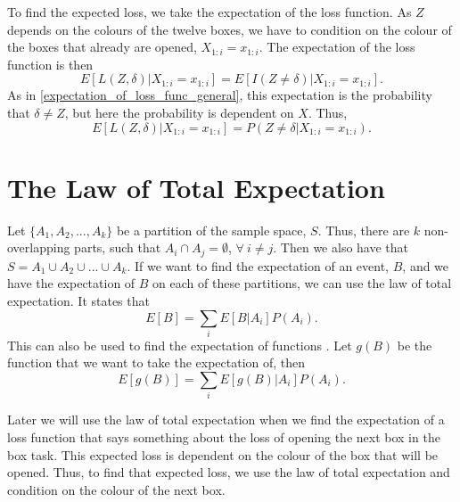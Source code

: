 To find the expected loss, we take the expectation of the loss function. As $Z$ depends on the colours of the twelve boxes, we have to condition on the colour of the boxes that already are opened, $ X_{1:i}=x_{1:i}$. The expectation of the loss function is then
\begin{equation*}
    E[L(Z,\delta)|X_{1:i}=x_{1:i}] = E[I(Z\neq \delta)|X_{1:i}=x_{1:i}].
\end{equation*}
As in \eqref{expectation_of_loss_func_general}, this expectation is the probability that $\delta \neq Z$, but here the probability is dependent on $X$. Thus,
\begin{equation}
\label{exp_loss_theory}
    E[L(Z,\delta)|X_{1:i}=x_{1:i}] = P(Z\neq \delta|X_{1:i}=x_{1:i}).
\end{equation}








\section{The Law of Total Expectation}
Let $\{A_1,A_2,...,A_k\}$ be a partition of the sample space, $S$. Thus, there are $k$ non-overlapping parts, such that $A_i \cap A_j = \emptyset$, $\forall \:
i \neq j$. Then we also have that $S = A_1 \cup A_2 \cup...\cup A_k$. If we want to find the expectation of an event, $B$, and we have the expectation of $B$ on each of these partitions, we can use the law of total expectation. It states that
\begin{equation}
    E[B] = \sum_i E[B|A_i]P(A_i).
\end{equation}
This can also be used to find the expectation of functions \citep{schay2016introduction}. Let $g(B)$ be the function that we want to take the expectation of, then
\begin{equation}
\label{law_tot_exp_func}
    E[g(B)] = \sum_i E[g(B)|A_i]P(A_i).
\end{equation}

Later we will use the law of total expectation when we find the expectation of a loss function that says something about the loss of opening the next box in the box task. This expected loss is dependent on the colour of the box that will be opened. Thus, to find that expected loss, we use the law of total expectation and condition on the colour of the next box. 

